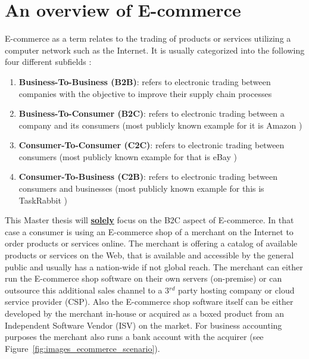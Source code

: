 
\section{An overview of \gls{E-commerce}}
\label{sec:e_commerce_scenario}

\gls{E-commerce} as a term relates to the trading of products or services utilizing a computer network such as the Internet. It is usually categorized into the following four different subfields \citep{sen2015study}:\@

\begin{enumerate}
  \item \textbf{Business-To-Business (\gls{B2B})}: refers to electronic trading between companies with the objective to improve their supply chain processes
  \item \textbf{Business-To-Consumer (\gls{B2C})}: refers to electronic trading between a company and its consumers (most publicly known example for it is Amazon \citep{Amazon.com})
  \item \textbf{Consumer-To-Consumer (\gls{C2C})}: refers to electronic trading between consumers (most publicly known example for that is eBay \citep{eBayInc})
  \item \textbf{Consumer-To-Business (\gls{C2B})}: refers to electronic trading between consumers and businesses (most publicly known example for this is TaskRabbit \citep{TaskRabbit})
\end{enumerate}

This Master thesis will \textbf{\underline{solely}} focus on the \gls{B2C} aspect of \gls{E-commerce}. In that case a consumer is using an \gls{E-commerce} shop of a merchant on the Internet to order products or services online. The merchant is offering a catalog of available products or services on the Web, that is available and accessible by the general public and usually has a nation-wide if not global reach. The merchant can either run the \gls{E-commerce} shop software on their own servers (on-premise) or can outsource this additional sales channel to a 3$^{rd}$ party hosting company or cloud service provider (\gls{CSP}). Also the \gls{E-commerce} shop software itself can be either developed by the merchant in-house or acquired as a boxed product from an Independent Software Vendor (\gls{ISV}) on the market. For business accounting purposes the merchant also runs a bank account with the acquirer (see Figure~\ref{fig:images_ecommerce_scenario}). \\


